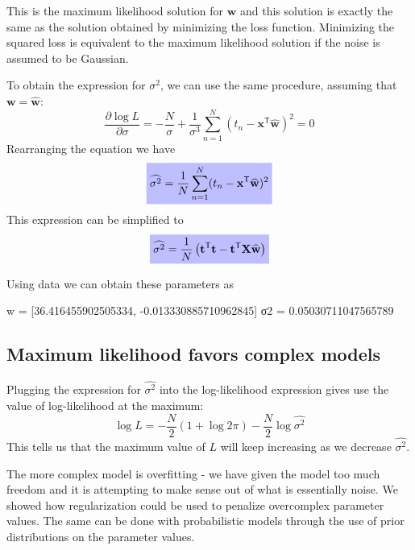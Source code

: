 This is the maximum likelihood solution for $\mathbf{w}$ and this solution is exactly
the same as the solution obtained by minimizing the loss function.
Minimizing the squared loss is equivalent
to the maximum likelihood solution if the noise is assumed to be Gaussian.

To obtain the expression for $\sigma^2$, we can use the same procedure,
assuming that $\mathbf{w} = \widehat{\mathbf{w}}$:
\begin{equation}
\frac{\partial \log L}{\partial \sigma} = -\frac{N}{\sigma} +
\frac{1}{\sigma^3}\sum_{n=1}^{N} (t_{n} - \mathbf{x}^{\mathsf{T}}\widehat{\mathbf{w}})^2 = 0
\end{equation}
Rearranging the equation we have
\begin{equation}
\highlighteq{
\widehat{\sigma^2} = \frac{1}{N}\sum_{n=1}^{N} (t_n - \mathbf{x}^{\mathsf{T}}\widehat{\mathbf{w}})^2
}
\end{equation}
This expression can be simplified to
\begin{equation}
\highlighteq{
\widehat{\sigma^2} = \frac{1}{N}\left(
\mathbf{t}^{\mathsf{T}}\mathbf{t} - \mathbf{t}^{\mathsf{T}}\mathbf{X}\widehat{\mathbf{w}}
\right)
}
\end{equation}

Using  data we can obtain these parameters as
\begin{textcode}
w = [36.416455902505334, -0.013330885710962845]
σ2 = 0.05030711047565789
\end{textcode}

\subsection{Maximum likelihood favors complex models}

Plugging the expression for $\widehat{\sigma^2}$ into the log-likelihood
expression gives use the value of log-likelihood at the maximum:
\begin{equation}
\log L = -\frac{N}{2}(1 + \log 2\pi) - \frac{N}{2}\log\widehat{\sigma^2}
\end{equation}
This tells us that the maximum value of $L$ will keep increasing as
we decrease $\widehat{\sigma^2}$.

The more complex model is overfitting - we have given the model too
much freedom and it is attempting to make sense out of what is essentially noise.
We showed how regularization could be used to penalize overcomplex
parameter values. The same can be done with probabilistic models through the use
of prior distributions on the parameter values.


